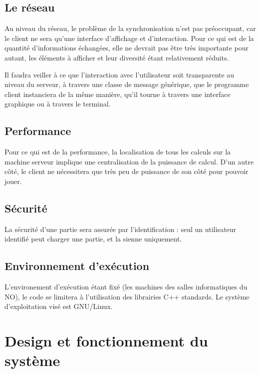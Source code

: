 \documentclass[a4paper,titlepage]{scrreprt}
\begin{document}
\begin{itemize}
  \subsection{Le réseau}
  Au niveau du réseau, le problème de la synchronisation n'est pas préoccupant, 
  car le client ne sera qu'une interface d'affichage et d'interaction. 
  Pour ce qui est de la quantité d'informations échangées, 
  elle ne devrait pas être très importante pour autant, 
  les éléments à afficher et leur diversité étant relativement réduits.
  
  Il faudra veiller à ce que l'interaction avec l'utilisateur soit transparente 
  au niveau du serveur, à travers une classe de message générique, 
  que le programme client instanciera de la même manière, 
  qu'il tourne à travers une interface graphique ou à travers le terminal.
  \subsection{Performance}
  Pour ce qui est de la performance, la localisation de tous les calculs sur la machine serveur 
  implique une centralisation de la puissance de calcul. 
  D'un autre côté, le client ne nécessitera que très peu de puissance de son côté pour pouvoir jouer.
  \subsection{Sécurité}
  La sécurité d'une partie sera assurée par l'identification : 
  seul un utilisateur identifié peut charger une partie, et la sienne uniquement.
  \subsection{Environnement d'exécution}
  L'environement d'exécution étant fixé (les machines des salles informatiques du NO), 
  le code se limitera à l'utilisation des librairies C++ standards. 
  Le système d'exploitation visé est GNU/Linux.
\section{Design et fonctionnement du système}

\end{itemize}
\end{document}
